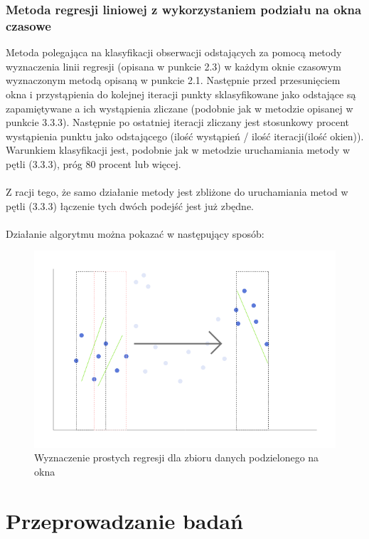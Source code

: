 \documentclass[eng,printmode]{mgr}
\begin{document}
\subsection{Metoda regresji liniowej z wykorzystaniem podziału na okna czasowe}
Metoda polegająca na klasyfikacji obserwacji odstających za pomocą metody wyznaczenia linii regresji (opisana w punkcie 2.3) w każdym oknie czasowym wyznaczonym metodą opisaną w punkcie 2.1. Następnie przed przesunięciem okna i przystąpienia do kolejnej iteracji punkty sklasyfikowane jako odstające są zapamiętywane a ich wystąpienia zliczane (podobnie jak w metodzie opisanej w punkcie 3.3.3). Następnie po ostatniej iteracji zliczany jest stosunkowy procent wystąpienia punktu jako odstającego (ilość wystąpień / ilość iteracji(ilość okien)). Warunkiem klasyfikacji jest, podobnie jak w metodzie uruchamiania metody w pętli (3.3.3), próg 80 procent lub więcej. \\\\
Z racji tego, że samo działanie metody jest zbliżone do uruchamiania metod w pętli (3.3.3) łączenie tych dwóch podejść jest już zbędne.
\\\\
Działanie algorytmu można pokazać w następujący sposób:
\begin{figure}[H]
  \begin{center}
  \includegraphics[scale=0.7]{reg_windowed}
  \end{center}
  \caption{Wyznaczenie prostych regresji dla zbioru danych podzielonego na okna}
\end{figure}
\chapter{Przeprowadzanie badań}
\end{document}

